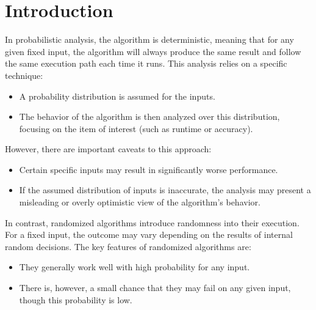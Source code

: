 \section{Introduction}

In probabilistic analysis, the algorithm is deterministic, meaning that for any given fixed input, the algorithm will always produce the same result and follow the same execution path each time it runs. This analysis relies on a specific technique:
\begin{itemize}
    \item A probability distribution is assumed for the inputs.
    \item The behavior of the algorithm is then analyzed over this distribution, focusing on the item of interest (such as runtime or accuracy).
\end{itemize}
However, there are important caveats to this approach:
\begin{itemize}
    \item Certain specific inputs may result in significantly worse performance.
    \item If the assumed distribution of inputs is inaccurate, the analysis may present a misleading or overly optimistic view of the algorithm's behavior.
\end{itemize}

In contrast, randomized algorithms introduce randomness into their execution. 
For a fixed input, the outcome may vary depending on the results of internal random decisions. 
The key features of randomized algorithms are:
\begin{itemize}
    \item They generally work well with high probability for any input.
    \item There is, however, a small chance that they may fail on any given input, though this probability is low.
\end{itemize}

